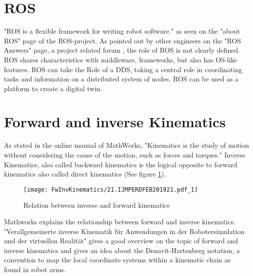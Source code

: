\section{ROS}
"\ac{ROS} is a flexible framework for writing robot software." as seen on the "about ROS" page of the ROS-project. As pointed out by other engineers on the "ROS Answers" page, a project related forum \cite{ROSAnswers_WhatIsRos}, the role of ROS is not clearly defined. ROS shares characteristics with middleware, frameworks, but also has \ac{OS}-like features. \ac{ROS} can take the Role of a \ac{DDS}, taking a central role in coordinating tasks and information on a distributed system of nodes. ROS can be used as a platform to create a digital twin.  %
\medskip

\section{Forward and inverse Kinematics}

As stated in the online manual of MathWorks, "Kinematics is the study of motion without considering the cause of the motion, such as forces and torques." \cite{MathWorksInverseKinematics}
Inverse Kinematics, also called backward kinematics is the logical opposite to forward kinematics also called direct kinematics (See figure \ref{fig:FwVsInvKin}). 


\begin{figure}[H]
	\texttt{[image: FwInvKinematics/21.IJMPERDFEB201921.pdf\_1]}
	\caption{Relation between inverse and forward kinematics \cite{SpaceStationManipulator}}
	\label{fig:FwVsInvKin}
\end{figure}







Mathworks \cite{forwardVsInverseKinematics} explains the relationship between forward and inverse kinematics.
"Verallgemeinerte inverse Kinematik für Anwendungen in der Robotersimulation und der virtuellen Realität" \cite{allgInvKin} gives a good overview on the topic of forward and inverse kinematics and gives an idea about the Denavit-Hartenberg notation, a convention to map the local coordinate systems within a kinematic chain as found in robot arms.

